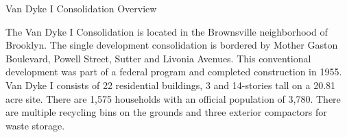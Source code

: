 Van Dyke I Consolidation Overview

The Van Dyke I Consolidation is located in the Brownsville neighborhood of Brooklyn. The single development consolidation is bordered by Mother Gaston Boulevard, Powell Street, Sutter and Livonia Avenues. This conventional development was part of a federal program and completed construction in 1955. Van Dyke I consists of 22 residential buildings, 3 and 14-stories tall on a 20.81 acre site. There are 1,575 households with an official population of 3,780. There are multiple recycling bins on the grounds and three exterior compactors for waste storage. 